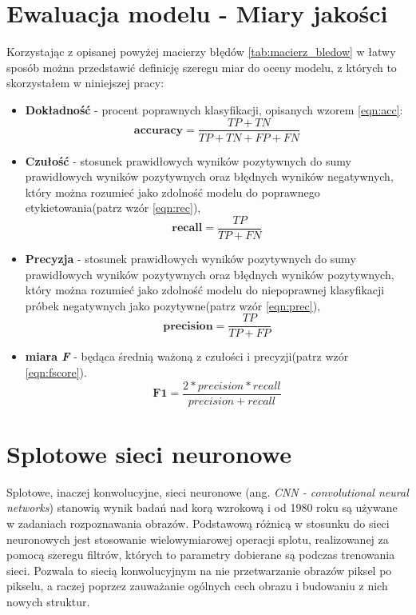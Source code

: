 \section{Ewaluacja modelu - Miary jakości}

Korzystając z opisanej powyżej macierzy błędów \ref{tab:macierz_bledow} w łatwy sposób można przedstawić definicję szeregu miar do oceny modelu, z których to skorzystałem w niniejszej pracy:
\begin{itemize}
	\item \textbf{Dokładność} - procent poprawnych klasyfikacji, opisanych wzorem \ref{eqn:acc}:
		\begin{equation}
			\mathbf{accuracy} = \frac{TP + TN}{TP + TN + FP + FN}
			\label{eqn:acc}
		\end{equation}
	\item \textbf{Czułość} - stosunek prawidłowych wyników pozytywnych do sumy prawidłowych wyników pozytywnych oraz błędnych wyników negatywnych, który można rozumieć jako zdolność modelu do poprawnego etykietowania(patrz wzór \ref{eqn:rec}),
		\begin{equation}
			\mathbf{recall} = \frac{TP}{TP + FN}
			\label{eqn:rec}
		\end{equation}
	\item \textbf{Precyzja} - stosunek prawidłowych wyników pozytywnych do sumy prawidłowych wyników pozytywnych oraz błędnych wyników pozytywnych, który można rozumieć jako zdolność modelu do niepoprawnej klasyfikacji próbek negatywnych jako pozytywne(patrz wzór \ref{eqn:prec}),
		\begin{equation}
			\mathbf{precision} = \frac{TP}{TP + FP}
			\label{eqn:prec}
		\end{equation}
	\item \textbf{miara \textit{F}} - będąca średnią ważoną z czułości i precyzji(patrz wzór \ref{eqn:fscore}).
		\begin{equation}
			\mathbf{F1}= \frac{2 * precision * recall}{precision + recall}
			\label{eqn:fscore}
		\end{equation}
\end{itemize}

\section{Splotowe sieci neuronowe}

Splotowe, inaczej konwolucyjne, sieci neuronowe (ang. \textit{CNN - convolutional neural networks}) stanowią wynik badań nad korą wzrokową i od 1980 roku są używane w zadaniach rozpoznawania obrazów\cite{hands_on}. Podstawową różnicą w stosunku do sieci neuronowych jest stosowanie wielowymiarowej operacji splotu, realizowanej za pomocą szeregu filtrów, których to parametry dobierane są podczas trenowania sieci. Pozwala to siecią konwolucyjnym na nie przetwarzanie obrazów piksel po pikselu, a raczej poprzez zauważanie ogólnych cech obrazu i budowaniu z nich nowych struktur. \\

